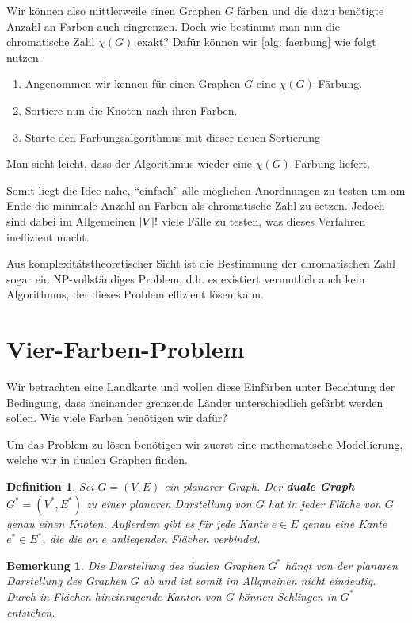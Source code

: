 \documentclass[ngerman, a4paper, 12pt]{article}
\newcommand{\begriff}[1]{\textbf{#1}}
\newcounter{themcount}
\theoremstyle{plain}
\newtheorem{definition}[themcount]{Definition}
\newtheorem{bemerkung}[themcount]{Bemerkung}
\theoremstyle{break}
\theoremstyle{proofstyle}
\begin{document}
	Wir können also mittlerweile einen Graphen $G$ färben und die dazu benötigte Anzahl an Farben auch eingrenzen. Doch wie bestimmt man nun die chromatische Zahl $\chi(G)$ exakt? Dafür können wir \cref{alg: faerbung} wie folgt nutzen.
	\begin{enumerate}[nolistsep, topsep=-\parskip]
		\item Angenommen wir kennen für einen Graphen $G$ eine $\chi(G)$-Färbung.
		\item Sortiere nun die Knoten nach ihren Farben.
		\item Starte den Färbungsalgorithmus mit dieser neuen Sortierung
	\end{enumerate}
	Man sieht leicht, dass der Algorithmus wieder eine $\chi(G)$-Färbung liefert.
	
	Somit liegt die Idee nahe, \enquote{einfach} alle möglichen Anordnungen zu testen um am Ende die minimale Anzahl an Farben als chromatische Zahl zu setzen. Jedoch sind dabei im Allgemeinen $\left| V \right|!$ viele Fälle zu testen, was dieses Verfahren ineffizient macht.
	
	Aus komplexitätstheoretischer Sicht ist die Bestimmung der chromatischen Zahl sogar ein NP-vollständiges Problem, d.h. es existiert vermutlich auch kein Algorithmus, der dieses Problem effizient lösen kann.
	
\pagebreak

	\section{Vier-Farben-Problem}
	
	Wir betrachten eine Landkarte und wollen diese Einfärben unter Beachtung der Bedingung, dass aneinander grenzende Länder unterschiedlich gefärbt werden sollen. Wie viele Farben benötigen wir dafür?
	
	Um das Problem zu lösen benötigen wir zuerst eine mathematische Modellierung, welche wir in dualen Graphen finden.
	
	\begin{definition}
		Sei $G = (V,E)$ ein planarer Graph. Der \begriff{duale Graph} $G^\ast = (V^\ast, E^\ast)$ zu einer planaren Darstellung von $G$ hat in jeder Fläche von $G$ genau einen Knoten. Außerdem gibt es für jede Kante $e \in E$ genau eine Kante $e^\ast \in E^\ast$, die die an $e$ anliegenden Flächen verbindet.
	\end{definition}

	\begin{bemerkung}
		Die Darstellung des dualen Graphen $G^\ast$ hängt von der planaren Darstellung des Graphen $G$ ab und ist somit im Allgmeinen nicht eindeutig. Durch in Flächen hineinragende Kanten von $G$ können Schlingen in $G^\ast$ entstehen. 
	\end{bemerkung}
\end{document}
